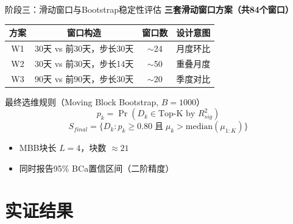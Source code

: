 \documentclass{beamer}
\begin{document}
\begin{frame}{阶段三：滑动窗口与Bootstrap稳定性评估}
    \textbf{三套滑动窗口方案（共84个窗口）}
    \begin{table}
        \centering
        \begin{tabular}{cccc}
            \toprule
            方案 & 窗口构造 & 窗口数 & 设计意图 \\
            \midrule
            W1 & 30天 vs 前30天，步长30天 & $\sim$24 & 月度环比 \\
            W2 & 30天 vs 前30天，步长14天 & $\sim$50 & 重叠月度 \\
            W3 & 90天 vs 前90天，步长30天 & $\sim$20 & 季度对比 \\
            \bottomrule
        \end{tabular}
    \end{table}
    
    \begin{block}{最终选维规则（Moving Block Bootstrap, $B=1000$）}
        \begin{equation*}
            p_k = \Pr(D_k \in \text{Top-K by } R^2_{sig})
        \end{equation*}
        \begin{equation*}
            S_{final} = \{D_k : p_k \geq 0.80 \;\text{且}\; \mu_k > \text{median}(\mu_{1:K})\}
        \end{equation*}
        \begin{itemize}
            \item MBB块长 $L=4$，块数 $\approx 21$
            \item 同时报告95\% BCa置信区间（二阶精度）
        \end{itemize}
    \end{block}
\end{frame}

\section{实证结果}
\end{document}
